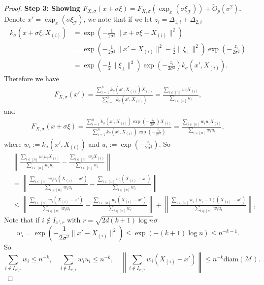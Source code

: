 \documentclass[10pt,a4paper]{amsart}
\def\Prob{{\mathbb P}}
\def\calM{\mathcal{M}}
\begin{document}
\begin{proof}
\noindent\textbf{Step 3: Showing $F_{X,\sigma}(x+\sigma\xi)=F_{X,\sigma}(\exp_x(\sigma \xi_{\mathcal{T}}))+\widetilde{O}_p(\sigma^2)$.}
Denote $x'=\exp_x(\sigma \xi_{\mathcal{T}})$, we note that if we let $z_i=\Delta_{1,i}+\Delta_{2,i}$
\begin{align*}
k_\sigma(x+\sigma \xi, X_{(i)})&=\exp(-\frac1{2\sigma^2}\|x+\sigma\xi-X_{(i)}\|^2)\\
&=\exp(-\frac1{2\sigma^2}\|x'-X_{(i)}\|^2-\frac1{2}\|\xi_\bot\|^2)\exp(-\frac{z_i}{2\sigma^2})\\
&=\exp(-\frac1{2}\|\xi_\bot\|^2)\exp(-\frac{z_i}{2\sigma^2})k_\sigma(x', X_{(i)}).
\end{align*}
Therefore we have
\begin{align*}
F_{X, \sigma}(x')= \frac{\sum\limits_{i=1}^n k_\sigma(x', X_{(i)}) X_{(i)}}{\sum\limits_{i=1}^n k_\sigma(x', X_{(i)})}
=\frac{\sum_{i\in [n]} w_i X_{(i)}}{\sum_{i\in [n]} w_i},
\end{align*}
and 
\begin{align*}
F_{X, \sigma}(x+\sigma \xi)=
\frac{\sum\limits_{i=1}^n k_\sigma(x', X_{(i)})\exp(-\frac{z_i}{2\sigma^2}) X_{(i)}}{\sum\limits_{i=1}^n k_\sigma(x', X_{(i)})\exp(-\frac{z_i}{2\sigma^2})}
=\frac{\sum_{i\in [n]} w_iu_i X_{(i)}}{\sum_{i\in [n]} w_iu_i},
\end{align*}
where $w_i:=k_\sigma(x', X_{(i)})$ and $u_i:=\exp(-\frac{z_i}{2\sigma^2})$. 
So 
\begin{align*}
&\left\|\frac{\sum_{i\in [n]} w_iu_i X_{(i)}}{\sum_{i\in [n]} w_iu_i}-
\frac{\sum_{i\in [n]} w_i X_{(i)}}{\sum_{i\in [n]} w_i}\right\|\\
&=\left\|\frac{\sum_{i\in [n]} w_iu_i (X_{(i)}-x')}{\sum_{i\in [n]} w_iu_i}-
\frac{\sum_{i\in [n]} w_i (X_{(i)}-x')}{\sum_{i\in [n]} w_i}\right\|\\
&\leq\left\|\frac{\sum_{i\in [n]} w_i (X_{(i)}-x')}{\sum_{i\in [n]} w_iu_i}-\frac{\sum_{i\in [n]} w_i (X_{(i)}-x')}{\sum_{i\in [n]} w_i}\right\|+\left\|\frac{\sum_{i\in [n]} w_i(u_i-1) (X_{(i)}-x')}{\sum_{i\in [n]} w_iu_i}\right\|,
\end{align*}
 Note that if $i\notin I_{x',r}$ with $r=\sqrt{2d(k+1)\log n}\sigma$  
\[
w_i=\exp(-\frac{1}{2\sigma^2} \|x'-X_{(i)}\|^2)
\leq \exp(-(k+1) \log n)\leq n^{-k-1}. 
\]
So 
\[
\sum_{i\notin I_{x',r}} w_i\leq n^{-k},\quad
\sum_{i\notin I_{x',r}} w_iu_i\leq n^{-k},\quad
\left\|\sum_{i\notin I_{x',r}} w_i (X_{(i)}-x')\right\|\leq n^{-k}\text{diam}(\calM). 
\]


\end{proof}
\end{document}
